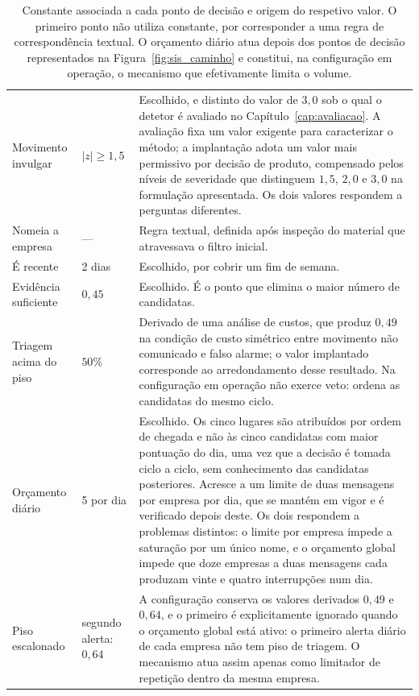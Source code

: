 \begin{table}[!htbp]
\caption[Limiares da política de decisão e sua proveniência]{Constante associada a cada ponto de
decisão e origem do respetivo valor. O primeiro ponto não utiliza constante, por corresponder a
uma regra de correspondência textual. O orçamento diário atua depois dos pontos de decisão
representados na Figura~\ref{fig:sis_caminho} e constitui, na configuração em operação, o
mecanismo que efetivamente limita o volume.}
\label{tab:sis_portas}
\centering
\small
\begin{tabular}{L{0.22\textwidth} L{0.16\textwidth} p{0.50\textwidth}}
\toprule
{} &  &  \\
\midrule
Movimento invulgar & $|z| \geq 1{,}5$ & Escolhido, e distinto do valor de $3{,}0$ sob o qual o
detetor é avaliado no Capítulo~\ref{cap:avaliacao}. A avaliação fixa um valor exigente para
caracterizar o método; a implantação adota um valor mais permissivo por decisão de produto,
compensado pelos níveis de severidade que distinguem $1{,}5$, $2{,}0$ e $3{,}0$ na formulação
apresentada. Os dois valores respondem a perguntas diferentes. \\
Nomeia a empresa & --- & Regra textual, definida após inspeção do material que atravessava o
filtro inicial. \\
É recente & 2 dias & Escolhido, por cobrir um fim de semana. \\
Evidência suficiente & $0{,}45$ & Escolhido. É o ponto que elimina o maior número de candidatas. \\
Triagem acima do piso & $50\%$ & Derivado de uma análise de custos, que produz $0{,}49$ na
condição de custo simétrico entre movimento não comunicado e falso alarme; o valor implantado
corresponde ao arredondamento desse resultado. Na configuração em operação não exerce veto:
ordena as candidatas do mesmo ciclo. \\
Orçamento diário & 5 por dia & Escolhido. Os cinco lugares são atribuídos por ordem de chegada e
não às cinco candidatas com maior pontuação do dia, uma vez que a decisão é tomada ciclo a ciclo,
sem conhecimento das candidatas posteriores. Acresce a um limite de duas mensagens por empresa por
dia, que se mantém em vigor e é verificado depois deste. Os dois respondem a problemas distintos: o
limite por empresa impede a saturação por um único nome, e o orçamento global impede que doze
empresas a duas mensagens cada produzam vinte e quatro interrupções num dia. \\
\addlinespace
Piso escalonado & segundo alerta: $0{,}64$ & A configuração conserva os valores derivados $0{,}49$
e $0{,}64$, e o primeiro é explicitamente ignorado quando o orçamento global está ativo: o
primeiro alerta diário de cada empresa não tem piso de triagem. O mecanismo atua assim apenas
como limitador de repetição dentro da mesma empresa. \\
\bottomrule
\end{tabular}
\end{table}

